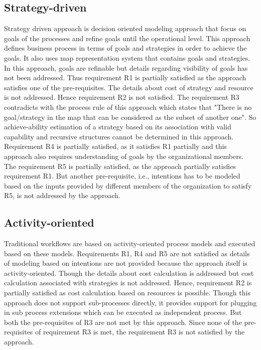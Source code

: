\subsection{Strategy-driven} 
Strategy driven approach is decision oriented modeling approach that focus on goals of the processes and refine goals until the operational level. This approach defines business process in terms of goals and strategies in order to achieve the goals. It also uses map representation system that contains goals and strategies. In this approach, goals are refinable but details regarding visibility of goals has not been addressed. Thus requirement R1 is partially satisfied as the approach satisfies one of the pre-requisites. The details about cost of strategy and resource is not addressed. Hence requirement R2 is not satisfied. The requirement R3 contradicts with the process rule of this approach which states that "There is no goal/strategy in the map that can be considered as the subset of another one". So achieve-ability estimation of a strategy based on its association with valid capability and recursive structures cannot be determined in this approach. Requirement R4 is partially satisfied, as it satisfies R1 partially and this approach also requires understanding of goals by the organizational members. The requirement R5 is partially satisfied, as the approach partially satisfies requirement R1. But another pre-requisite, i.e., intentions has to be modeled based on the inputs provided by different members of the organization to satisfy R5, is not addressed by the approach. 

\subsection{Activity-oriented} 
Traditional workflows are based on activity-oriented process models and executed based on these models. Requirements R1, R4 and R5 are not satisfied as details of modeling based on intentions are not provided because the approach itself is activity-oriented. Though the details about cost calculation is addressed but cost calculation associated with strategies is not addressed. Hence, requirement R2 is partially satisfied as cost calculation based on resources is possible. Though this approach does not support sub-processes directly, it provides support for plugging in sub process extensions which can be executed as independent process. But both the pre-requisites of R3 are not met by this approach. Since none of the pre-requisites of requirement R3 is met, the requirement R3 is not satisfied by the approach. 

